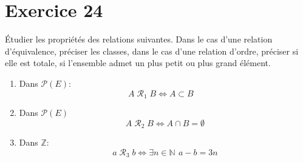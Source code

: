 \documentclass{report}
\begin{document}
\section{Exercice 24}
\qs{}
{
\'Etudier les propri\'et\'es des relations suivantes. Dans le cas
d'une relation d'\'equivalence, pr\'eciser les classes, dans le cas
d'une relation d'ordre, pr\'eciser si elle est totale, si l'ensemble admet
un plus petit ou plus grand \'el\'ement.
\begin{enumerate}
    \item Dans $\mathcal{P}(E)$:
      $$A\;\mathcal{R}_1\; B \iff A\subset B\quad$$

    \item Dans $\mathcal{P}(E)$ $$A\;\mathcal{R}_2\; B \iff A\cap
      B=\emptyset$$
    \item Dans $\mathbb{Z}$:
      $$ a\;\mathcal{R}_3\; b \iff \exists n\in \mathbb{N} \ \,a-b=3n$$
\end{enumerate}
}
\end{document}
